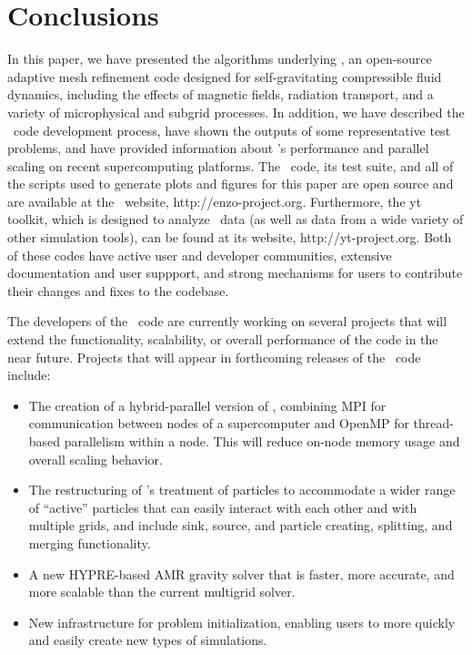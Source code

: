 
\section{Conclusions}

In this paper, we have presented the algorithms underlying \enzo, an
open-source adaptive mesh refinement code designed for
self-gravitating compressible fluid dynamics, including the effects of
magnetic fields, radiation transport, and a variety of microphysical
and subgrid processes.  In addition, we have described the \enzo\ code
development process, have shown the outputs of some representative
test problems, and have provided information about \enzo's performance
and parallel scaling on recent supercomputing platforms.  The \enzo\
code, its test suite, and all of the scripts used to generate plots
and figures for this paper are open source and are available at the
\enzo\ website, http://enzo-project.org.  Furthermore, the yt toolkit,
which is designed to analyze \enzo\ data (as well as data from a wide
variety of other simulation tools), can be found at its website,
http://yt-project.org.  Both of these codes have active user and
developer communities, extensive documentation and user suppport, and
strong mechanisms for users to contribute their changes and fixes to
the codebase.

The developers of the \enzo\ code are currently working on several
projects that will extend the functionality, scalability, or overall
performance of the code in the near future.  Projects that will appear
in forthcoming releases of the \enzo\ code include:

\begin{itemize}
\item The creation of a hybrid-parallel version of \enzo, combining
MPI for communication between nodes of a supercomputer and OpenMP for
thread-based parallelism within a node.  This will reduce on-node
memory usage and overall scaling behavior.
\item The restructuring of \enzo's treatment of particles to
accommodate a wider range of ``active'' particles that can easily
interact with each other and with multiple grids, and include sink,
source, and particle creating, splitting, and merging functionality.
\item A new HYPRE-based AMR gravity solver that is faster, more
accurate, and more scalable than the current multigrid solver.
\item New infrastructure for problem initialization, enabling
  users to more quickly and easily create new types of simulations.
\end{itemize}

